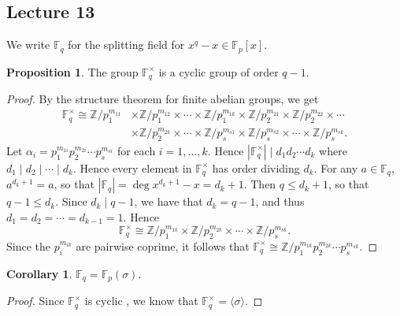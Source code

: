 \documentclass[10pt,letterpaper,cm]{nupset}
\theoremstyle{definition}
\theoremstyle{theorem}
\newtheorem{prop}[definition]{Proposition}
\newtheorem{corollary}[definition]{Corollary}
\theoremstyle{remark}
\newcommand{\F}{\mathbb F}
\newcommand{\Z}{\mathbb Z}
\newcommand{\1}{\mathbf{1}}
\newcommand{\0}{\vec 0}
\begin{document}
\subsection{Lecture 13}


We write $\F_q$ for the splitting field for $x^q -x \in \F_p[x]$.


\begin{prop} 
The group $\F_q^{\times}$ is a cyclic group of order $q-1$.
\end{prop}
\begin{proof}
By the structure theorem for finite abelian groups, we get 
\begin{align*}
\F_q^{\times} \cong  \Z/p_1^{m_{11}}  & \times \Z/p_1^{m_{12}} \times \cdots \times \Z/p_1^{m_{1k}}
 \times \Z/p_2^{m_{21}} \times \Z/p_2^{m_{22}}  \times \cdots
 \\ &  \times \Z/p_2^{m_{2k}} \times \cdots \times \Z/p_s^{m_{s1}} \times \Z/p_s^{m_{s2}} \times \cdots \times \Z/p_s^{m_{sk}} .
\end{align*}
Let $\alpha_i = p_1^{m_{1i}}p_2^{m_{2i}}\cdots p_s^{m_{si}}$ for each $i=1, \ldots, k$. Hence $\left\lvert{\F_q^{\times}}\right\rvert \mid d_1d_2 \cdots d_k$ where $d_1 \mid d_2 \mid \cdots \mid d_k$. Hence every element in $\F_q^{\times}$ has order dividing $d_k$.  For any $a\in \F_q$, $a^{d_k +1} =a$, so that $\left\lvert{\F_q}\right\rvert = \deg{x^{d_k+1} -x} = d_k+1$. Then $q \leq d_k+1$, so that $q-1 \leq d_k$. Since $d_k \mid q-1$, we have that $d_k = q-1$, and thus $d_1 = d_2 = \cdots = d_{k-1} = 1$. Hence $$\F_q^{\times} \cong \Z/p_1^{m_{1k}} \times \Z/p_2^{m_{2k}} \times \cdots \times \Z/p_s^{m_{sk}}.$$ Since the $p_i^{m_{ik}}$ are pairwise coprime, it follows that $\F_q^{\times} \cong  \Z/p_1^{m_{1k}} p_2^{m_{2k}} \cdots p_s^{m_{sk}}$. 
\end{proof}
\begin{corollary}
$\F_q = \F_p(\sigma)$.
\end{corollary}
\begin{proof}
Since $\F_q^{\times}$ is cyclic , we know that $\F_q^{\times} = \langle \sigma \rangle$.
\end{proof}
\end{document}
